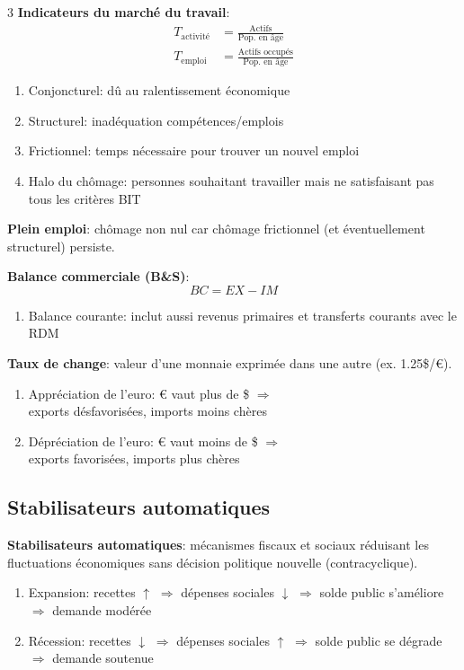 \documentclass[12pt, a4paper]{article}
\begin{document}
\begin{multicols*}{3}
\textbf{Indicateurs du marché du travail}:
\[
\boxed{
\begin{aligned}
T_{\text{activité}}&=\frac{\text{Actifs}}{\text{Pop. en âge}}\\
T_{\text{emploi}}&=\frac{\text{Actifs occupés}}{\text{Pop. en âge}}
\end{aligned}}
\]
\begin{enumerate}[\roman*.]
  \item Conjoncturel: dû au ralentissement économique
  \item Structurel: inadéquation compétences/emplois
  \item Frictionnel: temps nécessaire pour trouver un nouvel emploi
  \item Halo du chômage: personnes souhaitant travailler mais ne satisfaisant pas tous les critères BIT
\end{enumerate}
\textbf{Plein emploi}: chômage non nul car chômage frictionnel (et éventuellement structurel) persiste.

\textbf{Balance commerciale (B\&S)}:
\[
\boxed{BC=EX-IM}
\]
\begin{enumerate}[\roman*.]
  \item Balance courante: inclut aussi revenus primaires et transferts courants avec le RDM
\end{enumerate}

\textbf{Taux de change}: valeur d'une monnaie exprimée dans une autre (ex. 1.25\$/€).
\begin{enumerate}[\roman*.]
  \item Appréciation de l'euro: € vaut plus de \$ $\Rightarrow$\\ exports désfavorisées, imports moins chères
  \item Dépréciation de l'euro: € vaut moins de \$ $\Rightarrow$\\ exports favorisées, imports plus chères
\end{enumerate}

\colbreak
\subsection{Stabilisateurs automatiques}

\textbf{Stabilisateurs automatiques}: mécanismes fiscaux et sociaux réduisant les fluctuations économiques sans décision politique nouvelle (contracyclique).

\begin{enumerate}[\roman*.]
  \item Expansion: recettes $\uparrow$ $\Rightarrow$ dépenses sociales $\downarrow$ $\Rightarrow$ solde public s'améliore $\Rightarrow$ demande modérée 
  \item Récession: recettes $\downarrow$ $\Rightarrow$ dépenses sociales $\uparrow$ $\Rightarrow$ solde public se dégrade $\Rightarrow$ demande soutenue 
\end{enumerate}


\end{multicols*}
\end{document}
